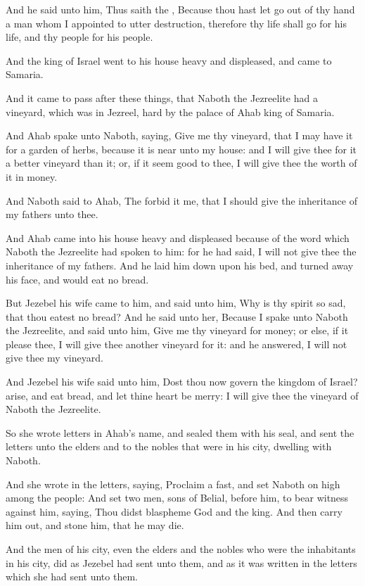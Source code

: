 \Verse And he said unto him, Thus saith the \LORD, Because thou hast let go out of thy hand a man whom I appointed to utter destruction, therefore thy life shall go for his life, and thy people for his people.

\Verse And the king of Israel went to his house heavy and displeased, and came to Samaria.


\Chapter
\Verse And it came to pass after these things, that Naboth the Jezreelite had a vineyard, which was in Jezreel, hard by the palace of Ahab king of Samaria.

\Verse And Ahab spake unto Naboth, saying, Give me thy vineyard, that I may have it for a garden of herbs, because it is near unto my house: and I will give thee for it a better vineyard than it; or, if it seem good to thee, I will give thee the worth of it in money.

\Verse And Naboth said to Ahab, The \LORD forbid it me, that I should give the inheritance of my fathers unto thee.

\Verse And Ahab came into his house heavy and displeased because of the word which Naboth the Jezreelite had spoken to him: for he had said, I will not give thee the inheritance of my fathers. And he laid him down upon his bed, and turned away his face, and would eat no bread.

\Verse But Jezebel his wife came to him, and said unto him, Why is thy spirit so sad, that thou eatest no bread?  \Verse And he said unto her, Because I spake unto Naboth the Jezreelite, and said unto him, Give me thy vineyard for money; or else, if it please thee, I will give thee another vineyard for it: and he answered, I will not give thee my vineyard.

\Verse And Jezebel his wife said unto him, Dost thou now govern the kingdom of Israel? arise, and eat bread, and let thine heart be merry: I will give thee the vineyard of Naboth the Jezreelite.

\Verse So she wrote letters in Ahab's name, and sealed them with his seal, and sent the letters unto the elders and to the nobles that were in his city, dwelling with Naboth.

\Verse And she wrote in the letters, saying, Proclaim a fast, and set Naboth on high among the people: \Verse And set two men, sons of Belial, before him, to bear witness against him, saying, Thou didst blaspheme God and the king. And then carry him out, and stone him, that he may die.

\Verse And the men of his city, even the elders and the nobles who were the inhabitants in his city, did as Jezebel had sent unto them, and as it was written in the letters which she had sent unto them.

